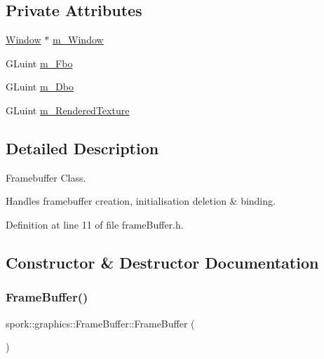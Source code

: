 \subsection*{Private Attributes}
\begin{DoxyCompactItemize}
\item 
\hyperlink{classspork_1_1graphics_1_1_window}{Window} $\ast$ \hyperlink{classspork_1_1graphics_1_1_frame_buffer_aeba86bc3c16a729e0ee0046c0d227dd4}{m\+\_\+\+Window}
\item 
G\+Luint \hyperlink{classspork_1_1graphics_1_1_frame_buffer_a4889c9e79c1feb6cfe7d83075af6fc84}{m\+\_\+\+Fbo}
\item 
G\+Luint \hyperlink{classspork_1_1graphics_1_1_frame_buffer_ae67a64c4136a360da28458b87e48082b}{m\+\_\+\+Dbo}
\item 
G\+Luint \hyperlink{classspork_1_1graphics_1_1_frame_buffer_a0d1b23266ca24b011fd8e1c9d7390f22}{m\+\_\+\+Rendered\+Texture}
\end{DoxyCompactItemize}


\subsection{Detailed Description}
Framebuffer Class. 

Handles framebuffer creation, initialisation deletion \& binding. 

Definition at line 11 of file frame\+Buffer.\+h.



\subsection{Constructor \& Destructor Documentation}
\mbox{\label{classspork_1_1graphics_1_1_frame_buffer_abbfe4ea72dabd467d5166daa1ce02178}} 
\subsubsection{\texorpdfstring{Frame\+Buffer()}{FrameBuffer()}\hspace{0.1cm}{\footnotesize\ttfamily [1/2]}}
{\footnotesize\ttfamily spork\+::graphics\+::\+Frame\+Buffer\+::\+Frame\+Buffer (\begin{DoxyParamCaption}{ }\end{DoxyParamCaption})}



